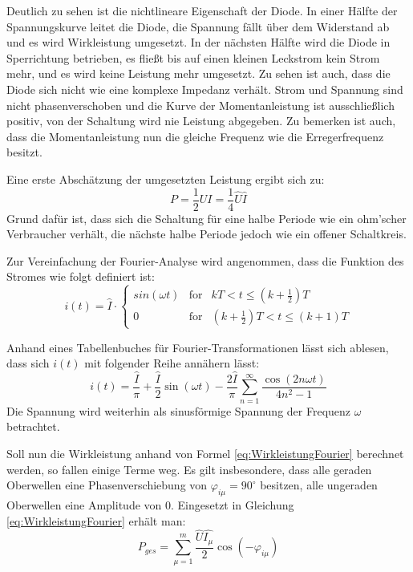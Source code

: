 Deutlich zu sehen ist die nichtlineare Eigenschaft der Diode. In einer Hälfte der Spannungskurve leitet die Diode, die Spannung fällt über dem Widerstand ab und es wird Wirkleistung umgesetzt. In der nächsten Hälfte wird die Diode in Sperrichtung betrieben, es fließt bis auf einen kleinen Leckstrom kein Strom mehr, und es wird keine Leistung mehr umgesetzt.
Zu sehen ist auch, dass die Diode sich nicht wie eine komplexe Impedanz verhält. Strom und Spannung sind nicht phasenverschoben und die Kurve der Momentanleistung ist ausschließlich positiv, von der Schaltung wird nie Leistung abgegeben. Zu bemerken ist auch, dass die Momentanleistung nun die gleiche Frequenz wie die Erregerfrequenz besitzt.

Eine erste Abschätzung der umgesetzten Leistung ergibt sich zu:
\begin{equation*}
P = \frac{1}{2} UI = \frac{1}{4}\hat{U}\hat{I}
\end{equation*}
Grund dafür ist, dass sich die Schaltung für eine halbe Periode wie ein ohm'scher Verbraucher verhält, die nächste halbe Periode jedoch wie ein offener Schaltkreis.

Zur Vereinfachung der Fourier-Analyse wird angenommen, dass die Funktion des Stromes wie folgt definiert ist:
\begin{equation}
i(t)=\hat{I}\cdot \left\{ 
\begin{array}{ccr}
	sin(\omega t) & \mbox{for} & kT < t \leq (k+\frac{1}{2})T \\
	0 & \mbox{for} & (k+\frac{1}{2})T < t \leq (k+1)T
\end{array}
\right.
\end{equation}
\cite{calpolyFourier}

Anhand eines Tabellenbuches für Fourier-Transformationen lässt sich ablesen, dass sich $i(t)$ mit folgender Reihe annähern lässt:
\begin{equation}
i(t) = \frac{\hat{I}}{\pi} + \frac{\hat{I}}{2}\sin(\omega t) - \frac{2\hat{I}}{\pi}\sum_{n=1}^{\infty}\frac{\cos(2n\omega t)}{4n^2 - 1}
\end{equation}
Die Spannung wird weiterhin als sinusförmige Spannung der Frequenz $\omega$ betrachtet.

Soll nun die Wirkleistung anhand von Formel \eqref{eq:WirkleistungFourier} berechnet werden, so fallen einige Terme weg. Es gilt insbesondere, dass alle geraden Oberwellen eine Phasenverschiebung von $\varphi_{i\mu} = 90^\circ$ besitzen, alle ungeraden Oberwellen eine Amplitude von 0. Eingesetzt in Gleichung \eqref{eq:WirkleistungFourier} erhält man:
\begin{equation*}
P_{ges} = \sum_{\mu=1}^m\frac{\hat{U}\hat{I_\mu}}{2}\cos(-\varphi_{i\mu})
\end{equation*}

